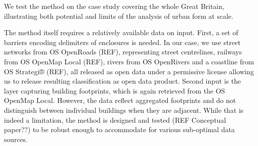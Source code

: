 We test the method on the case study covering the whole Great Britain, illustrating both
potential and limits of the analysis of urban form at scale.

The method itself requires a relatively available data on input. First, a set of
barriers encoding delimiters of enclosures is needed. In our case, we use street
networks from OS OpenRoads (REF), representing street centrelines, railways from OS
OpenMap Local (REF), rivers from OS OpenRivers and a coastline from OS Strategi® (REF),
all released as open data under a permissive license allowing us to release
resulting classification as open data product. Second input is the layer capturing
building footprints, which is again retrieved from the OS OpenMap Local. However, the
data reflect aggregated footprints and do not distinguish between individual buildings
when they are adjacent. While that is indeed a limitation, the method is designed and
tested (REF Conceptual paper??) to be robust enough to accommodate for various
sub-optimal data sources.
